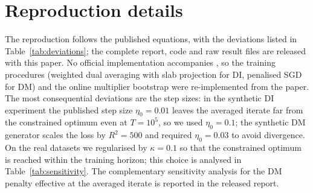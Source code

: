 \documentclass[10pt,twocolumn]{article}
\begin{document}
\section{Reproduction details}
\label{app:repro}

The reproduction follows the published equations, with the deviations listed in
Table~\ref{tab:deviations}; the complete report, code and raw result files are released with this
paper.  No official implementation accompanies \citet{roy2026uq}, so the training procedures
(weighted dual averaging with slab projection for DI, penalised SGD for DM) and the online multiplier
bootstrap were re-implemented from the paper.  The most consequential deviations are the step sizes:
in the synthetic DI experiment the published step size $\eta_0=0.01$ leaves the averaged iterate far
from the constrained optimum even at $T=10^5$, so we used $\eta_0=0.1$; the synthetic DM generator
scales the loss by $R^2=500$ and required $\eta_0=0.03$ to avoid divergence.  On the real datasets we
regularised by $\kappa=0.1$ so that the constrained optimum is reached within the training horizon;
this choice is analysed in Table~\ref{tab:sensitivity}.  The complementary sensitivity analysis for
the DM penalty effective at the averaged iterate is reported in the released report.

\begin{table}[t]
\centering
\small
\setlength{\tabcolsep}{4pt}
\caption{Deviations of the reproduction from the published settings (all other settings as in the
original Table~1).  ``z-score'' refers to normalising real features before training.}
\label{tab:deviations}
\end{table}


\end{document}
